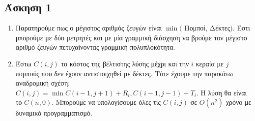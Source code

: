 \newpage
\subsection*{Άσκηση 1}

\begin{enumerate}[(1.)]
    \item
        Παρατηρούμε πως ο μέγιστος αριθμός ζευγών είναι $\min($ Πομποί, Δέκτες$)$. Έστι μπορούμε με δύο μετρητές και με μία γραμμική διάσχηση να
        βρούμε τον μέγιστο αριθμό ζευγών πετυχαίνοντας γραμμική πολυπλοκότητα.

    \item 
        Έστω $C(i,j)$ το κόστος της βέλτιστης λύσης μέχρι και την $i$ κεραία με $j$ πομπούς που δεν έχουν αντιστοιχηθεί με δέκτες. Τότε έχουμε την παρακάτω αναδρομική σχέση:
        $C(i,j) = \min{C(i-1, j+1) + R_i, C(i-1,j-1) + T_i}$.
        Η λύση θα είναι το $C(n,0)$. Μπορούμε να υπολογίσουμε όλες τις $C(i,j)$ σε $O(n^2)$ χρόνο με δυναμικό προγραμματισμό.

\end{enumerate}




